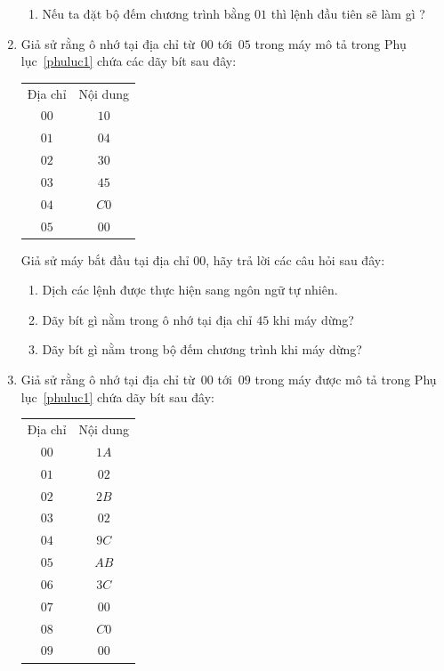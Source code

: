 \begin{multicols}{2}
\begin{enumerate}
\begin{enumerate}
    \item Nếu ta đặt bộ đếm chương trình bằng $01$ thì lệnh đầu tiên sẽ làm gì ?

    \end{enumerate}

  \item Giả sử rằng ô nhớ tại địa chỉ từ~$00$ tới~$05$ trong máy mô tả trong Phụ
    lục~\ref{phuluc1} chứa các dãy bít sau đây:

    \begin{tabular}{cc}
      Địa chỉ & Nội dung \\
      $00$    & $10$     \\
      $01$    & $04$     \\
      $02$    & $30$  \\
      $03$    & $45$     \\
      $04$    & $C0$  \\
      $05$    & $00$     
    \end{tabular}

    Giả sử máy bắt đầu tại địa chỉ $00$, hãy trả lời các câu hỏi sau đây:

    \begin{enumerate}
    \item Dịch các lệnh được thực hiện sang ngôn ngữ tự nhiên.

    \item Dãy bít gì nằm trong ô nhớ tại địa chỉ $45$ khi máy dừng?

    \item Dãy bít gì nằm trong bộ đếm chương trình khi máy dừng?
    \end{enumerate}

  \item Giả sử rằng ô nhớ tại địa chỉ từ~$00$ tới~$09$ trong máy được mô tả trong Phụ lục~\ref{phuluc1} chứa dãy bít sau đây:

    \begin{tabular}{cc}
      Địa chỉ & Nội dung \\
      $00$    & $1A$     \\
      $01$    & $02$     \\
      $02$    & $2B$     \\
      $03$    & $02$     \\
      $04$    & $9C$     \\
      $05$    & $AB$     \\
      $06$    & $3C$     \\
      $07$    & $00$     \\
      $08$    & $C0$     \\
      $09$    & $00$   
    \end{tabular}


\end{enumerate}
\end{multicols}
